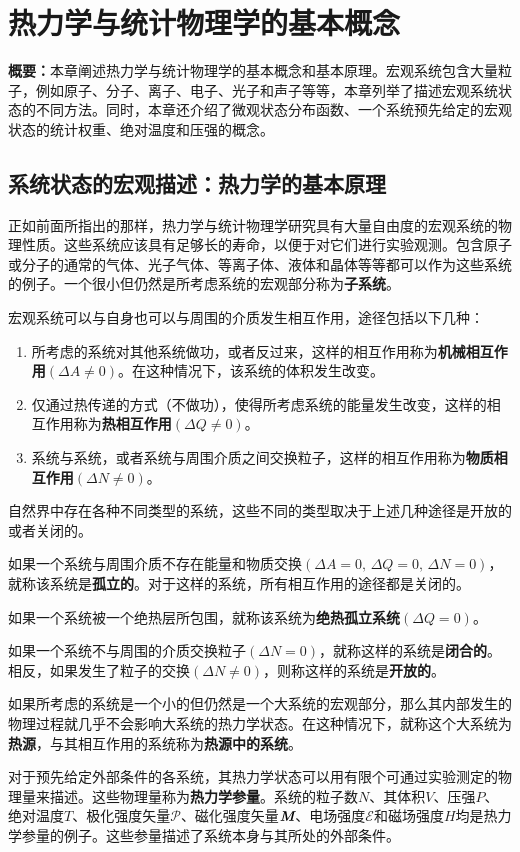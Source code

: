 \section{热力学与统计物理学的基本概念}

\textbf{概要：}本章阐述热力学与统计物理学的基本概念和基本原理。宏观系统包含大量粒子，例如原子、分子、离子、电子、光子和声子等等，本章列举了描述宏观系统状态的不同方法。同时，本章还介绍了微观状态分布函数、一个系统预先给定的宏观状态的统计权重、绝对温度和压强的概念。


\subsection{系统状态的宏观描述：热力学的基本原理}
正如前面所指出的那样，热力学与统计物理学研究具有大量自由度的宏观系统的物理性质。这些系统应该具有足够长的寿命，以便于对它们进行实验观测。包含原子 或分子的通常的气体、光子气体、等离子体、液体和晶体等等都可以作为这些系统的例子。一个很小但仍然是所考虑系统的宏观部分称为\textbf{子系统}。

宏观系统可以与自身也可以与周围的介质发生相互作用，途径包括以下几种：
\begin{enumerate}
	\item 所考虑的系统对其他系统做功，或者反过来，这样的相互作用称为\textbf{机械相互作用}$(\Delta A \neq 0)$。在这种情况下，该系统的体积发生改变。
	\item 仅通过热传递的方式（不做功），使得所考虑系统的能量发生改变，这样的相互作用称为\textbf{热相互作用}$(\Delta Q \neq 0)$。
	\item 系统与系统，或者系统与周围介质之间交换粒子，这样的相互作用称为\textbf{物质相互作用}$(\Delta N \neq 0)$。
\end{enumerate}

自然界中存在各种不同类型的系统，这些不同的类型取决于上述几种途径是开放的或者关闭的。

如果一个系统与周围介质不存在能量和物质交换$(\Delta A = 0,\, \Delta Q = 0,\, \Delta N = 0)$，就称该系统是\textbf{孤立的}。对于这样的系统，所有相互作用的途径都是关闭的。

如果一个系统被一个绝热层所包围，就称该系统为\textbf{绝热孤立系统}$(\Delta Q = 0)$。

如果一个系统不与周围的介质交换粒子$(\Delta N = 0)$，就称这样的系统是\textbf{闭合的}。相反，如果发生了粒子的交换$(\Delta N \neq 0)$，则称这样的系统是\textbf{开放的}。

如果所考虑的系统是一个小的但仍然是一个大系统的宏观部分，那么其内部发生的物理过程就几乎不会影响大系统的热力学状态。在这种情况下，就称这个大系统为\textbf{热源}，与其相互作用的系统称为\textbf{热源中的系统}。

对于预先给定外部条件的各系统，其热力学状态可以用有限个可通过实验测定的物理量来描述。这些物理量称为\textbf{热力学参量}。系统的粒子数$N$、其体积$V$、压强$P$、绝对温度$T$、极化强度矢量$\mathscr{P}$、磁化强度矢量$\emph{\textbf{M}}$、电场强度$\bm{\mathcal{E}}$和磁场强度$\bm{\mathit{H}}$均是热力学参量的例子。这些参量描述了系统本身与其所处的外部条件。

